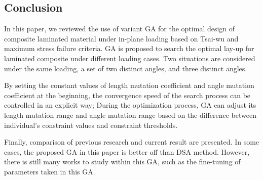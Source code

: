 \subsection{Conclusion}
In this paper, we reviewed the use of variant GA for the optimal design of composite
laminated material under in-plane loading based on Tsai-wu and maximum stress
failure criteria. GA is proposed to search the optimal lay-up for laminated
composite under different loading cases. Two situations are considered under the same
loading, a set of two distinct angles, and three distinct angles. 

By setting the constant values of length mutation coefficient and angle mutation
coefficient at the beginning, the convergence speed of the search process can be
controlled in an explicit way; During the optimization process, GA can adjust
its length mutation range and angle mutation range based on the difference
between individual's constraint values and constraint thresholds.  

Finally, comparison of previous research and current result are presented. In
some cases, the proposed GA in this paper is better off than DSA method.
However, there is still many works to study within this GA, such as the
fine-tuning of parameters taken in this GA.



